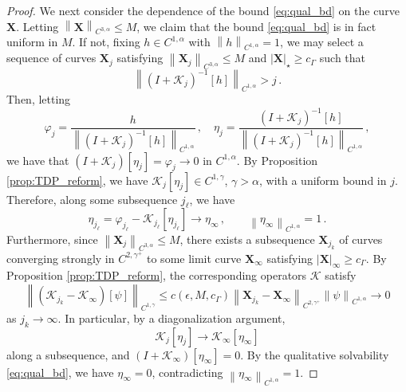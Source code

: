 \documentclass[11pt,reqno]{amsart}
\newcommand{\X}{\bm{X}}
\newcommand{\abs}[1]{\left\lvert #1 \right\rvert}
\newcommand{\norm}[1]{\left\lVert #1 \right\rVert}
\newcommand{\mc}[1]{\mathcal{#1}}
\theoremstyle{definition}
\begin{document}
\begin{proof}
We next consider the dependence of the bound \eqref{eq:qual_bd} on the curve $\X$. Letting $\norm{\X}_{C^{3,\alpha}}\le M$, we claim that the bound \eqref{eq:qual_bd} is in fact uniform in $M$. If not, fixing $h\in C^{1,\alpha}$ with $\norm{h}_{C^{1,\alpha}}=1$, we may select a sequence of curves $\X_j$ satisfying $\norm{\X_j}_{C^{3,\alpha}}\le M$ and $\abs{\X}_\star\ge c_\Gamma$ such that
\begin{equation}
  \norm{(I+\mc{K}_j)^{-1}[h]}_{C^{1,\alpha}}>j\,.
\end{equation}
Then, letting
\begin{equation}
  \varphi_j = \frac{h}{\norm{(I+\mc{K}_j)^{-1}[h]}_{C^{1,\alpha}}}\,, \quad
  \eta_j = \frac{(I+\mc{K}_j)^{-1}[h]}{\norm{(I+\mc{K}_j)^{-1}[h]}_{C^{1,\alpha}}}\,,
\end{equation}
we have that $(I+\mc{K}_j)[\eta_j]=\varphi_j\to 0$ in $C^{1,\alpha}$. By Proposition \ref{prop:TDP_reform}, we have $\mc{K}_j[\eta_j]\in C^{1,\gamma}$, $\gamma>\alpha$, with a uniform bound in $j$. Therefore, along some subsequence $j_\ell$, we have
\begin{equation}
  \eta_{j_\ell} = \varphi_{j_\ell} - \mc{K}_{j_\ell}[\eta_{j_\ell}]\to \eta_\infty\,, \qquad \norm{\eta_\infty}_{C^{1,\alpha}}=1\,.
\end{equation}
%
Furthermore, since $\norm{\X_j}_{C^{3,\alpha}}\le M$, there exists a subsequence $\X_{j_k}$ of curves converging strongly in $C^{2,\gamma^+}$ to some limit curve $\X_{\infty}$ satisfying $\abs{\X}_\infty\ge c_\Gamma$.
By Proposition \ref{prop:TDP_reform}, the corresponding operators $\mc{K}$ satisfy
\begin{equation} 
\norm{(\mc{K}_{j_k}-\mc{K}_{\infty})[\psi]}_{C^{1,\gamma}}\le c(\epsilon,M,c_\Gamma)\norm{\X_{j_k}-\X_\infty}_{C^{2,\gamma^+}}\norm{\psi}_{C^{1,\alpha}}
\to 0 
\end{equation}
as $j_k\to\infty$. In particular, by a diagonalization argument, 
\begin{equation}
  \mc{K}_j[\eta_j]\to  \mc{K}_\infty[\eta_\infty]
\end{equation}
along a subsequence, and $(I+\mc{K}_\infty)[\eta_\infty]=0$. By the qualitative solvability \eqref{eq:qual_bd}, we have $\eta_\infty=0$, contradicting $\norm{\eta_\infty}_{C^{1,\alpha}}=1$.



\end{proof}
\end{document}
